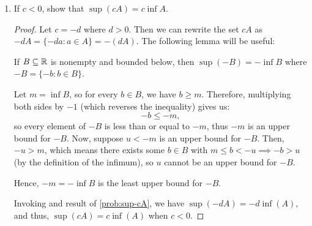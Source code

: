 \begin{problem}
\begin{enumerate}[label=(\alph*)]
\begin{proof}
        When $c > 0$, let us suppose for sake of contradiction that $cs$ is not the \textit{least} upper bound for $cA$. 
        This means $b = \sup(cA) < cs$ for some $b \in \R$. First, consider when $c > 0$. Dividing through by $c > 0$ gives us:
        \[
          \frac{b}{c} < s,
        \]
        so there exists some $a \in A$ such that:
        \[
          a > \frac{b}{c} \implies ca > b.
        \]
        However, a contradiction is reached because $ca \in cA$ and $b$ is supposed to be an upper bound for $cA$.

        Now consider the case when $c = 0$. In this case, $cA = \{0\}$, and thus $\sup(cA) = 0 = cs$. 

        Therefore, in both cases, we conclude that $cs$ is indeed the least upper bound for $cA$.
      \end{proof}

    \item If $c < 0$, show that $\sup(cA) = c \inf A$. \label{prob:sup-cA-negative}

      \begin{proof}

        Let $c = -d$ where $d > 0$. Then we can rewrite the set $cA$ as $-dA = \{-da : a \in A\} = -(dA)$. 
        The following lemma will be useful:

        \begin{lemma} \label{lem:sup-neg-bounded}
          If $B \subseteq \mathbb{R}$ is nonempty and bounded below, then $\sup(-B) = -\inf B$ 
          where $-B = \{-b : b \in B\}$.
        \end{lemma}

        \begin{subproof}
          Let $m = \inf B$, so for every $b \in B$, we have $b \geq m$.
          Therefore, multiplying both sides by $-1$ (which reverses the
          inequality) gives us:
          \[
            -b \leq -m,
          \]
          so every element of $-B$ is less than or equal to $-m$, thus $-m$ is
          an upper bound for $-B$. Now, suppose $u < -m$ is an upper bound for
          $-B$. Then,  $-u > m$, which means there exists some $b \in B$ with
          $m \leq b < -u \implies -b > u$ (by the definition of the infimum),
          so $u$ cannot be an upper bound for $-B$.

          Hence, $-m = -\inf B$ is the least upper bound for $-B$. 
        \end{subproof}

        Invoking  and result of \ref{prob:sup-cA},
        we have $\sup(-dA) = -d \inf(A)$, and thus, $\sup(cA) = c \inf(A)$ when
        $c < 0$. 

      \end{proof}

  \end{enumerate}
\end{problem}

